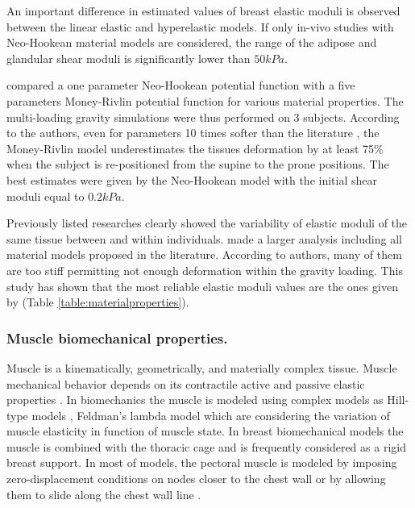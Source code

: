 An important difference in estimated values of breast elastic moduli is observed between the linear elastic and hyperelastic models. If only in-vivo studies with Neo-Hookean material models are considered, the range of the adipose and glandular shear moduli is significantly lower than $ 50kPa$. 

\cite{carter_biomechanical_2009} compared a one parameter Neo-Hookean potential function with a five parameters Money-Rivlin potential function for various material properties. The multi-loading gravity simulations were thus performed on 3 subjects. According to the authors, even for parameters 10 times softer than the literature \citep{abbas_biomechanical_2001}, the Money-Rivlin model underestimates the tissues deformation by at least 75\% when the subject is re-positioned from the supine to the prone positions. The best estimates were given by the Neo-Hookean model with the initial shear moduli equal to $0.2kPa$.  

Previously listed researches clearly showed the variability of elastic moduli of the same tissue between and within individuals. \cite{eder_comparison_2014} made a larger analysis including all material models proposed in the literature. According to authors, many of them are too stiff permitting not enough deformation within the gravity loading. This study has shown that the most reliable elastic moduli values are the ones given by \cite{rajagopal_creating_2008} (Table \ref{table:materialproperties}).

\subsubsection*{Muscle biomechanical properties.} 
Muscle is a kinematically, geometrically, and materially complex tissue. Muscle mechanical behavior depends on its contractile active and passive elastic properties \citep{nordez_muscle_2010}. In biomechanics the muscle is modeled using complex models as Hill-type models
\citep{zajac_muscle_1989}, Feldman’s lambda model \citep{feldman_once_1986} which are considering the variation of muscle elasticity in function of muscle state. In breast biomechanical models the muscle is combined with the thoracic cage and is frequently considered as a rigid breast support. In most of models, the pectoral muscle is modeled by imposing zero-displacement conditions on nodes closer to the chest wall \citep{abbas_biomechanical_2001,chung_modelling_2008,rajagopal_mapping_2010}  
or by allowing them to slide along the chest wall line \citep{han_nonlinear_2014,georgii_simulation_2016}.   

